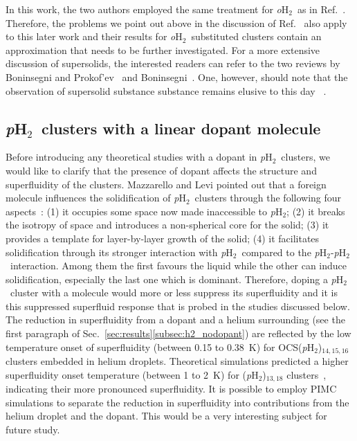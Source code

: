 \documentclass[12pt]{iopart}
\newcommand{\phtwo}{{\em p}H$_2$}
\newcommand{\ohtwo}{{\em o}H$_2$}
\begin{document}
In this work, the two authors employed the same treatment for \ohtwo~as in Ref.~\cite{mezzacapo_isotope_h2}. Therefore, the problems we point out above in the discussion of Ref.~\cite{mezzacapo_isotope_h2} also apply to this later work and their results for \ohtwo~substituted clusters contain an approximation that needs to be further investigated. 
For a more extensive discussion of supersolids, the interested readers can refer to the two reviews by Boninsegni and Prokof'ev~\cite{massimo_superdolid_rmp} and Boninsegni~\cite{boninsegni_review_supersolid}.
One, however, should note that the observation of supersolid substance substance remains elusive to this day
~\cite{chan_supersolid_absence}.

\subsection{\phtwo~clusters with a linear dopant molecule} \label{subsec:linear_dopant}

Before introducing any theoretical studies with a dopant in \phtwo~clusters, we would like to clarify 
that the presence of dopant affects the structure and superfluidity of the clusters. 
Mazzarello and Levi pointed out that a foreign molecule influences the solidification 
of \phtwo~clusters through the following four aspects~\cite{h2_solidify_levi,h2_solidify_dopant}: 
(1) it occupies some space now made inaccessible to \phtwo; 
(2) it breaks the isotropy of  space and introduces a non-spherical core for the solid; 
(3) it provides a template for layer-by-layer growth of the solid; 
(4) it facilitates solidification through its stronger interaction with \phtwo~compared to the \phtwo-\phtwo~interaction. 
Among them the first favours the liquid while the other can induce solidification, 
especially the last one which is dominant. 
Therefore, doping a \phtwo~cluster with a molecule would more or less suppress its superfluidity and it is this suppressed superfluid response that is probed in the studies discussed below. 
The reduction in superfluidity from a dopant and a helium surrounding (see the first paragraph of Sec.~\ref{sec:results}\ref{subsec:h2_nodopant}) are reflected by the low temperature onset of superfluidity   (between 0.15 to 0.38~K) for  OCS(\phtwo)$_{14,15,16}$ clusters embedded in helium droplets. 
Theoretical simulations predicted a higher superfluidity onset temperature (between 1 to 2~K) for (\phtwo)$_{13,18}$ clusters~\cite{sindzingre_pH2_superfluid}, indicating their more pronounced superfluidity. 
It is possible to employ PIMC simulations to separate the reduction in superfluidity  into  contributions from the helium droplet and the dopant. This would be a very interesting subject for future study.
\end{document}
